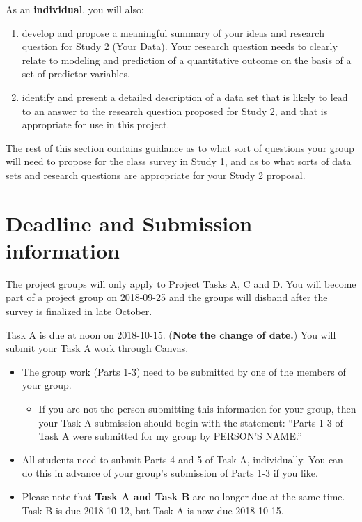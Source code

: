 \documentclass[]{book}
\providecommand{\tightlist}{%
  \setlength{\itemsep}{0pt}\setlength{\parskip}{0pt}}
\theoremstyle{definition}
\theoremstyle{definition}
\theoremstyle{definition}
\theoremstyle{remark}
\begin{document}
As an \textbf{individual}, you will also:

\begin{enumerate}
\def\labelenumi{\arabic{enumi}.}
\setcounter{enumi}{3}
\tightlist
\item
  develop and propose a meaningful summary of your ideas and research
  question for Study 2 (Your Data). Your research question needs to
  clearly relate to modeling and prediction of a quantitative outcome on
  the basis of a set of predictor variables.
\item
  identify and present a detailed description of a data set that is
  likely to lead to an answer to the research question proposed for
  Study 2, and that is appropriate for use in this project.
\end{enumerate}

The rest of this section contains guidance as to what sort of questions
your group will need to propose for the class survey in Study 1, and as
to what sorts of data sets and research questions are appropriate for
your Study 2 proposal.

\hypertarget{deadline-and-submission-information}{%
\section{Deadline and Submission
information}\label{deadline-and-submission-information}}

The project groups will only apply to Project Tasks A, C and D. You will
become part of a project group on 2018-09-25 and the groups will disband
after the survey is finalized in late October.

Task A is due at noon on 2018-10-15. (\textbf{Note the change of date.})
You will submit your Task A work through
\href{https://canvas.case.edu/}{Canvas}.

\begin{itemize}
\tightlist
\item
  The group work (Parts 1-3) need to be submitted by one of the members
  of your group.

  \begin{itemize}
  \tightlist
  \item
    If you are not the person submitting this information for your
    group, then your Task A submission should begin with the statement:
    ``Parts 1-3 of Task A were submitted for my group by PERSON'S
    NAME.''
  \end{itemize}
\item
  All students need to submit Parts 4 and 5 of Task A, individually. You
  can do this in advance of your group's submission of Parts 1-3 if you
  like.
\item
  Please note that \textbf{Task A and Task B} are no longer due at the
  same time. Task B is due 2018-10-12, but Task A is now due 2018-10-15.
\end{itemize}
\end{document}
